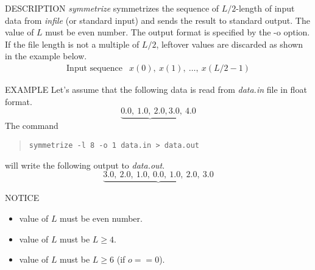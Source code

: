 \begin{synopsis}
\item[symmetrize] [ --l $L$ ] [ --o $o$ ] [ {\em infile} ]
\end{synopsis}

\begin{qsection}{DESCRIPTION}
{\em symmetrize} symmetrizes the sequence of $L/2$-length
of input data from {\em infile} (or standard input) and 
sends the result to standard output.
The value of $L$ must be even number.
The output format is specified by the -o option.
If the file length is not a multiple of $L/2$, 
leftover values are discarded as shown in the example below.
\begin{displaymath}
\begin{array}{ll}
\mbox{Input sequence} & x(0),~x(1),~\ldots,~x(L/2-1)
\end{array}
\end{displaymath}
\end{qsection}

\begin{options}
\end{options}
\begin{qsection}{EXAMPLE}
Let's assume that the following data
is read from {\em data.in} file in float format.
\begin{displaymath}
 \underbrace{0.0, ~1.0, ~2.0, 3.0}, ~4.0
\end{displaymath}
The command
\begin{quote}
\verb!symmetrize -l 8 -o 1 data.in > data.out!
\end{quote}
will write the following output to {\em data.out}.
\begin{displaymath}
 \underbrace{3.0, ~2.0, ~1.0, ~0.0, ~1.0, ~2.0, ~3.0}
\end{displaymath}
\end{qsection}

\begin{qsection}{NOTICE}
\begin{itemize}
\item value of $L$ must be even number.
\item value of $L$ must be $L \geq 4$.
\item value of $L$ must be $L \geq 6$ (if $o==0$).
\end{itemize}
\end{qsection}
